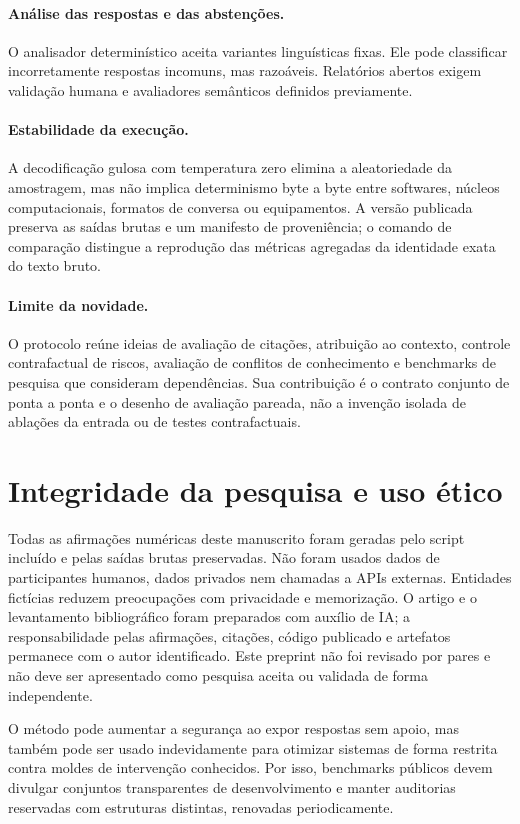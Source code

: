 \documentclass[10pt,twocolumn]{article}
\begin{document}
\paragraph{Análise das respostas e das abstenções.}
O analisador determinístico aceita variantes linguísticas fixas. Ele pode classificar incorretamente respostas incomuns, mas razoáveis. Relatórios abertos exigem validação humana e avaliadores semânticos definidos previamente.

\paragraph{Estabilidade da execução.}
A decodificação gulosa com temperatura zero elimina a aleatoriedade da amostragem, mas não implica determinismo byte a byte entre softwares, núcleos computacionais, formatos de conversa ou equipamentos. A versão publicada preserva as saídas brutas e um manifesto de proveniência; o comando de comparação distingue a reprodução das métricas agregadas da identidade exata do texto bruto.

\paragraph{Limite da novidade.}
O protocolo reúne ideias de avaliação de citações, atribuição ao contexto, controle contrafactual de riscos, avaliação de conflitos de conhecimento e benchmarks de pesquisa que consideram dependências. Sua contribuição é o contrato conjunto de ponta a ponta e o desenho de avaliação pareada, não a invenção isolada de ablações da entrada ou de testes contrafactuais.

\section{Integridade da pesquisa e uso ético}

Todas as afirmações numéricas deste manuscrito foram geradas pelo script incluído e pelas saídas brutas preservadas. Não foram usados dados de participantes humanos, dados privados nem chamadas a APIs externas. Entidades fictícias reduzem preocupações com privacidade e memorização. O artigo e o levantamento bibliográfico foram preparados com auxílio de IA; a responsabilidade pelas afirmações, citações, código publicado e artefatos permanece com o autor identificado. Este preprint não foi revisado por pares e não deve ser apresentado como pesquisa aceita ou validada de forma independente.

O método pode aumentar a segurança ao expor respostas sem apoio, mas também pode ser usado indevidamente para otimizar sistemas de forma restrita contra moldes de intervenção conhecidos. Por isso, benchmarks públicos devem divulgar conjuntos transparentes de desenvolvimento e manter auditorias reservadas com estruturas distintas, renovadas periodicamente.
\end{document}
